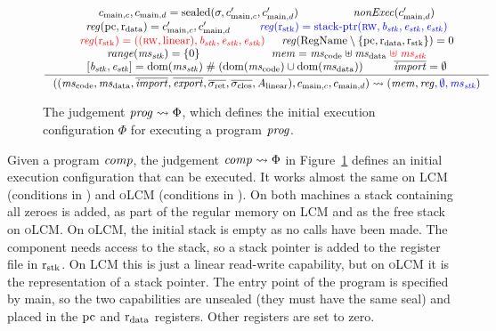 \documentclass{jfp}
\renewcommand{\RegName}{\shareddom{RegName}}
\renewcommand{\nonExec}[1]{\plainfun{nonExec}{#1}}
\newcommand{\trgcm}{\textsc{LCM}}
\newcommand{\srccm}{\textsc{oLCM}}
\begin{document}
\begin{figure}
  \centering
  \begin{equation*}
    \inference{
      c_{\mathrm{main},c},c_{\mathrm{main},d}  = \sealed{\sigma, c_{\mathrm{main},c}', c_{\mathrm{main},d}'} &
      \nonExec{c_{\mathrm{main},d}'}\\
      \reg(\pcreg,\rdata) = c_{\mathrm{main},c}', c_{\mathrm{main},d}' &
      \src{\reg(\rstk) = \stkptr{\rw,\baddr_\stk,\eaddr_\stk,\eaddr_\stk}} \\
      \trg{\reg(\rstk) = ((\rw,\linear),\baddr_\stk,\eaddr_\stk,\eaddr_\stk)} &
      \reg(\RegName \setminus \{\pcreg,\rdata,\rstk\}) = 0\\
      \range{\ms_\stk} = \{0\}&
      \mem = \mscode \uplus \msdata \trg{\;\uplus\; \ms_\stk} \\
      [\baddr_\stk,\eaddr_\stk] = \dom(\ms_\stk ) \mathrel{\#} (\dom(\mscode) \cup \dom(\msdata)) &
      \overline{\var{import}} = \emptyset
    }{
      ((\mscode, \msdata, \overline{\var{import}}, \overline{\var{export}}, \sigrets, \sigcloss,A_\linear),  c_{\mathrm{main},c}, c_{\mathrm{main},d}) \rightsquigarrow (\mem, \reg\src{, \emptyset, \ms_\stk})
    }
  \end{equation*}
  \caption{The judgement $\mathit{prog} \rightsquigarrow \Phi$, which defines the initial execution configuration $\Phi$ for executing a program $\mathit{prog}$.}
  \label{fig:init-ec}
\end{figure}

Given a program $\mathit{comp}$, the judgement $\mathit{comp} \rightsquigarrow \Phi$ in Figure~\ref{fig:init-ec} defines an initial execution configuration that can be executed.
It works almost the same on \trgcm{} (conditions in ) and \srccm{} (conditions in ).
On both machines a stack containing all zeroes is added, as part of the regular memory on \trgcm{} and as the free stack on \srccm{}.
On \srccm{}, the initial stack is empty as no calls have been made.
The component needs access to the stack, so a stack pointer is added to the register file in $\mathrm{r}_\mathrm{stk}$.
On \trgcm{} this is just a linear read-write capability, but on \srccm{} it is the representation of a stack pointer.
The entry point of the program is specified by main, so the two capabilities are unsealed (they must have the same seal) and placed in the $\mathrm{pc}$ and $\mathrm{r}_\mathrm{data}$ registers.
Other registers are set to zero.
\end{document}
